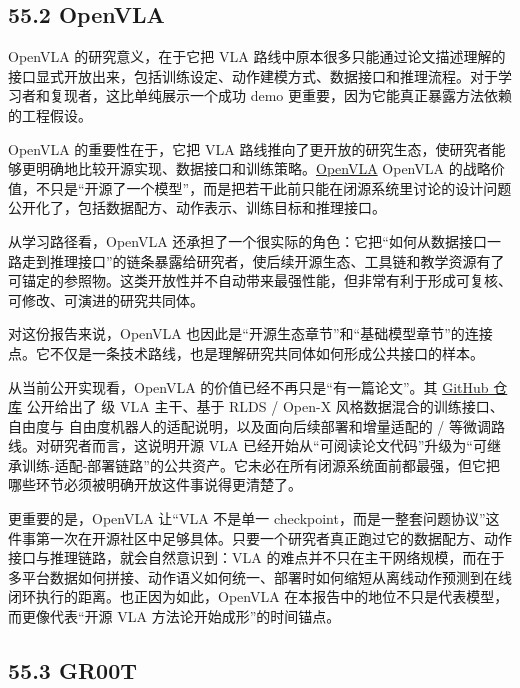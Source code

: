 \subsection*{55.2 OpenVLA}


OpenVLA 的研究意义，在于它把 VLA 路线中原本很多只能通过论文描述理解的接口显式开放出来，包括训练设定、动作建模方式、数据接口和推理流程。对于学习者和复现者，这比单纯展示一个成功 demo 更重要，因为它能真正暴露方法依赖的工程假设。

OpenVLA 的重要性在于，它把 VLA 路线推向了更开放的研究生态，使研究者能够更明确地比较开源实现、数据接口和训练策略。\href{https://arxiv.org/abs/2406.09246}{OpenVLA} OpenVLA 的战略价值，不只是“开源了一个模型”，而是把若干此前只能在闭源系统里讨论的设计问题公开化了，包括数据配方、动作表示、训练目标和推理接口。

从学习路径看，OpenVLA 还承担了一个很实际的角色：它把“如何从数据接口一路走到推理接口”的链条暴露给研究者，使后续开源生态、工具链和教学资源有了可锚定的参照物。这类开放性并不自动带来最强性能，但非常有利于形成可复核、可修改、可演进的研究共同体。

对这份报告来说，OpenVLA 也因此是“开源生态章节”和“基础模型章节”的连接点。它不仅是一条技术路线，也是理解研究共同体如何形成公共接口的样本。

从当前公开实现看，OpenVLA 的价值已经不再只是“有一篇论文”。其 \href{https://github.com/openvla/openvla}{GitHub 仓库} 公开给出了 \texttt{} 级 VLA 主干、基于 RLDS / Open-X 风格数据混合的训练接口、\texttt{} 自由度与 \texttt{} 自由度机器人的适配说明，以及面向后续部署和增量适配的 \texttt{} / \texttt{} 等微调路线。对研究者而言，这说明开源 VLA 已经开始从“可阅读论文代码”升级为“可继承训练-适配-部署链路”的公共资产。它未必在所有闭源系统面前都最强，但它把哪些环节必须被明确开放这件事说得更清楚了。

更重要的是，OpenVLA 让“VLA 不是单一 checkpoint，而是一整套问题协议”这件事第一次在开源社区中足够具体。只要一个研究者真正跑过它的数据配方、动作接口与推理链路，就会自然意识到：VLA 的难点并不只在主干网络规模，而在于多平台数据如何拼接、动作语义如何统一、部署时如何缩短从离线动作预测到在线闭环执行的距离。也正因为如此，OpenVLA 在本报告中的地位不只是代表模型，而更像代表“开源 VLA 方法论开始成形”的时间锚点。

\subsection*{55.3 GR00T}


